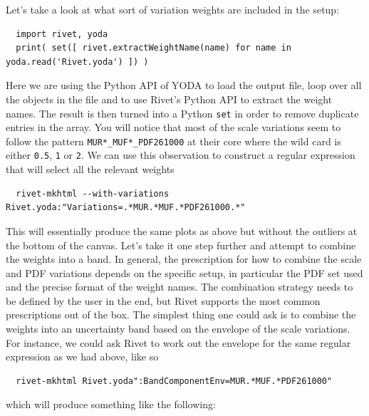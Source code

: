 \documentclass[10pt,fleqn]{scrartcl}
\theoremstyle{exstyle}
\begin{document}
Let's take a look at what sort of variation weights are included in the setup:
\begin{verbatim}
  import rivet, yoda
  print( set([ rivet.extractWeightName(name) for name in yoda.read('Rivet.yoda') ]) )
\end{verbatim}
Here we are using the Python API of YODA to load the output file, loop over all
the objects in the file and to use Rivet's Python API to extract the weight names.
The result is then turned into a Python \verb|set| in order to remove duplicate entries in the array.
You will notice that most of the scale variations
seem to follow the pattern \verb|MUR*_MUF*_PDF261000| at their core where the wild card is either \verb|0.5|,
\verb|1| or \verb|2|. We can use this observation to construct a regular expression that will select
all the relevant weights
\begin{verbatim}
  rivet-mkhtml --with-variations Rivet.yoda:"Variations=.*MUR.*MUF.*PDF261000.*"
\end{verbatim}
This will essentially produce the same plots as above but without the outliers
at the bottom of the canvas. Let's take it one step further and attempt to combine
the weights into a band. In general, the prescription for how to combine the
scale and PDF variations depends on the specific setup,
in particular the PDF set used and the precise format of the weight names.
The combination strategy needs to be defined by the user in the end, but Rivet
supports the most common prescriptions out of the box.
The simplest thing one could ask is to combine the weights into an uncertainty band
based on the envelope of the scale variations. For instance, we could ask Rivet to work out
the envelope for the same regular expression as we had above, like so
\begin{footnotesize}
\begin{verbatim}
  rivet-mkhtml Rivet.yoda":BandComponentEnv=MUR.*MUF.*PDF261000"
\end{verbatim}
\end{footnotesize}
which will produce something like the following:
\end{document}
